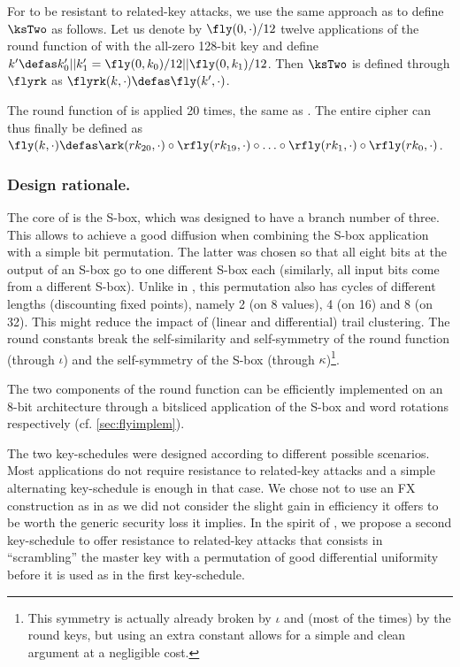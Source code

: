 \medskip

For \fly to be resistant to related-key attacks, we use the same approach as \noekeon \cite{noekeon} to define $\ksTwo$ as follows. Let us denote by $\fly(0, \cdot)/12$ twelve applications of the round function of \fly
with the all-zero 128-bit key and define $k' \defas k_0'||k_1' = \fly(0, k_0)/12||\fly(0, k_1)/12$. Then $\ksTwo$ is defined through $\flyrk$ as $\flyrk(k, \cdot) \defas \fly(k', \cdot)$. 

\medskip

The round function of \fly is applied 20 times, the same as \pride. The entire cipher can thus finally be defined
as $\fly(k,\cdot) \defas \ark(rk_{20},\cdot) \circ \rfly(rk_{19}, \cdot) \circ \ldots \circ \rfly(rk_1, \cdot) \circ \rfly(rk_0,\cdot)$.


\subsubsection*{Design rationale.}
The core of \fly is the \littlunOne S-box, which was designed to have a branch number of three. This allows to achieve a good diffusion when combining the S-box
application with a simple bit permutation. The latter was chosen so that all eight bits at the output of an S-box go to one different S-box each (similarly, all
input bits come from a different S-box). Unlike in \present, this permutation also has cycles of different lengths (discounting fixed points),
namely 2 (on 8 values), 4 (on 16) and 8 (on 32). This might reduce the impact of (linear and differential) trail clustering.
The round constants break the self-similarity and self-symmetry of the round function (through $\iota$)
and the self-symmetry of the S-box (through $\kappa$)\footnote{This symmetry is actually already broken by $\iota$ and (most of the times) by the round keys, but using an
extra constant allows for a simple and clean argument at a negligible cost.}.

The two components of the round function can be efficiently implemented on an 8-bit architecture through a bitsliced
application of the S-box and word rotations respectively (cf. \autoref{sec:flyimplem}).

The two key-schedules were designed according to different possible scenarios. Most applications do not require resistance to related-key attacks and a simple
alternating key-schedule is enough in that case. We chose not to use an FX construction as in \pride as we did not consider the slight gain in efficiency
it offers to be worth the generic security loss it implies. In the spirit of \noekeon, we propose a second key-schedule to offer resistance to related-key attacks
that consists in ``scrambling'' the master key with a permutation of good differential uniformity before it is used as in the first key-schedule.


